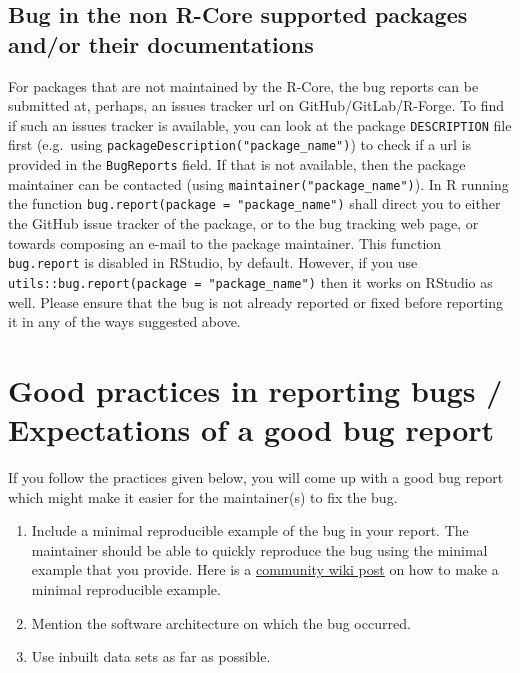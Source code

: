 \documentclass[
]{book}
\begin{document}
\hypertarget{nonRCorePkgBug}{%
\subsection{Bug in the non R-Core supported packages and/or their documentations}\label{nonRCorePkgBug}}

For packages that are not maintained by the R-Core, the bug reports can be submitted at, perhaps, an issues tracker url on GitHub/GitLab/R-Forge. To find if such an issues tracker is available, you can look at the package \texttt{DESCRIPTION} file first (e.g.~using \texttt{packageDescription("package\_name")}) to check if a url is provided in the \texttt{BugReports} field. If that is not available, then the package maintainer can be contacted (using \texttt{maintainer("package\_name")}). In R running the function \texttt{bug.report(package\ =\ "package\_name")} shall direct you to either the GitHub issue tracker of the package, or to the bug tracking web page, or towards composing an e-mail to the package maintainer. This function \texttt{bug.report} is disabled in RStudio, by default. However, if you use \texttt{utils::bug.report(package\ =\ "package\_name")} then it works on RStudio as well. Please ensure that the bug is not already reported or fixed before reporting it in any of the ways suggested above.

\hypertarget{good-practices-in-reporting-bugs-expectations-of-a-good-bug-report}{%
\section{Good practices in reporting bugs / Expectations of a good bug report}\label{good-practices-in-reporting-bugs-expectations-of-a-good-bug-report}}

If you follow the practices given below, you will come up with a good bug report which might make it easier for the maintainer(s) to fix the bug.

\begin{enumerate}
\def\labelenumi{\arabic{enumi}.}
\item
  Include a minimal reproducible example of the bug in your report. The maintainer should be able to quickly reproduce the bug using the minimal example that you provide. Here is a \href{https://stackoverflow.com/questions/5963269/how-to-make-a-great-r-reproducible-example}{community wiki post} on how to make a minimal reproducible example.
\item
  Mention the software architecture on which the bug occurred.
\item
  Use inbuilt data sets as far as possible.
\end{enumerate}
\end{document}
